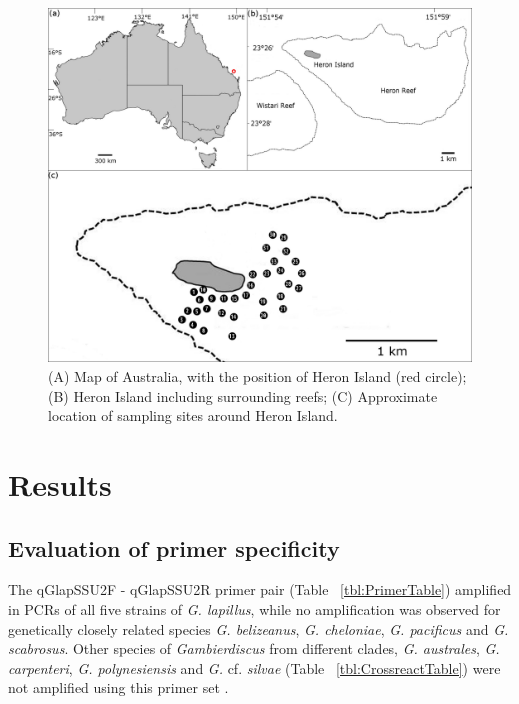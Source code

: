 \documentclass[12pt]{article}
\begin{document}
\begin{figure} 
\includegraphics[scale=1.7]{Hero_qpcr-figs/Fig1_Heron_sample-map_Nov18.png} 
\caption{(A) Map of Australia, with the position of Heron Island (red circle); (B) Heron Island including surrounding reefs; (C) Approximate location of sampling sites around Heron Island.} 
\label{fig:samplesites}
\end{figure} 


\newpage
\section*{Results}
\subsection*{Evaluation of primer specificity}
\FloatBarrier
The qGlapSSU2F - qGlapSSU2R primer pair (Table ~\ref{tbl:PrimerTable}) amplified in PCRs of all five strains of \emph{G. lapillus}, while no amplification was observed for genetically closely related species \emph{G. belizeanus}, \emph{G. cheloniae}, \emph{G. pacificus} and \emph{G. scabrosus}. 
Other species of \emph{Gambierdiscus} from different clades, \emph{G. australes}, \emph{G. carpenteri}, \emph{G. polynesiensis} and \emph{G.} cf. \emph{silvae} (Table ~\ref{tbl:CrossreactTable}) were not amplified using this primer set \citep{smith2016new,kretzschmar2017characterization}.
\end{document}
